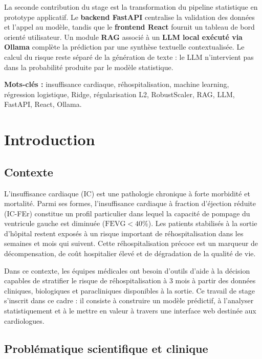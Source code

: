\documentclass[12pt,a4paper]{report}
\begin{document}
La seconde contribution du stage est la transformation du pipeline statistique en
prototype applicatif. Le \textbf{backend FastAPI} centralise la validation des données et
l'appel au modèle, tandis que le \textbf{frontend React} fournit un tableau de bord orienté
utilisateur. Un module \textbf{RAG} associé à un \textbf{LLM local exécuté via Ollama}
complète la prédiction par une synthèse textuelle contextualisée. Le calcul du risque reste
séparé de la génération de texte : le LLM n'intervient pas dans la probabilité produite par
le modèle statistique.

\textbf{Mots-clés :} insuffisance cardiaque, réhospitalisation, machine learning,
régression logistique, Ridge, régularisation L2, RobustScaler, RAG, LLM, FastAPI, React,
Ollama.

\tableofcontents
\listoffigures
\newpage

\chapter{Introduction}

\section{Contexte}

L'insuffisance cardiaque (IC) est une pathologie chronique à forte morbidité et mortalité. Parmi ses formes, l'insuffisance cardiaque à fraction d'éjection réduite (IC-FEr) constitue un profil particulier dans lequel la capacité de pompage du ventricule gauche est diminuée ($\text{FEVG} < 40\%$). Les patients stabilisés à la sortie d'hôpital restent exposés à un risque important de réhospitalisation dans les semaines et mois qui suivent. Cette réhospitalisation précoce est un marqueur de décompensation, de coût hospitalier élevé et de dégradation de la qualité de vie.

Dans ce contexte, les équipes médicales ont besoin d'outils d'aide à la décision capables de stratifier le risque de réhospitalisation à 3 mois à partir des données cliniques, biologiques et paracliniques disponibles à la sortie. Ce travail de stage s'inscrit dans ce cadre : il consiste à construire un modèle prédictif, à l'analyser statistiquement et à le mettre en valeur à travers une interface web destinée aux cardiologues.

\section{Problématique scientifique et clinique}
\end{document}
